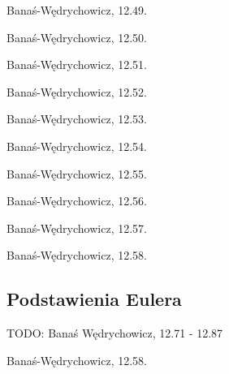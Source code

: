 \begin{problem}
    Banaś-Wędrychowicz, 12.49.
\end{problem}

\begin{problem}
    Banaś-Wędrychowicz, 12.50.
\end{problem}

\begin{problem}
    Banaś-Wędrychowicz, 12.51.
\end{problem}

\begin{problem}
    Banaś-Wędrychowicz, 12.52.
\end{problem}

\begin{problem}
    Banaś-Wędrychowicz, 12.53.
\end{problem}

\begin{problem}
    Banaś-Wędrychowicz, 12.54.
\end{problem}

\begin{problem}
    Banaś-Wędrychowicz, 12.55.
\end{problem}

\begin{problem}
    Banaś-Wędrychowicz, 12.56.
\end{problem}

\begin{problem}
    Banaś-Wędrychowicz, 12.57.
\end{problem}

\begin{problem}
    Banaś-Wędrychowicz, 12.58.
\end{problem}

\subsection{Podstawienia Eulera}

TODO: Banaś Wędrychowicz, 12.71 - 12.87

\begin{problem}
    Banaś-Wędrychowicz, 12.58.
\end{problem}

%